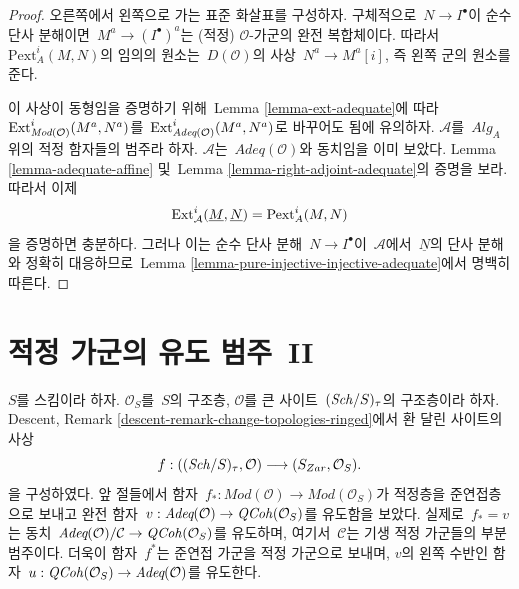 \begin{proof}
오른쪽에서 왼쪽으로 가는 표준 화살표를 구성하자. 구체적으로\ 
$N \to I^\bullet$이 순수 단사 분해이면\ 
$M^a \to (I^\bullet)^a$는 (적정) $\mathcal{O}$-가군의 완전
복합체이다. 따라서\  $\text{Pext}^i_A(M, N)$의 임의의 원소는\ 
$D(\mathcal{O})$의 사상\  $N^a \to M^a[i]$, 즉 왼쪽 군의 원소를 준다.

\medskip\noindent
이 사상이 동형임을 증명하기 위해\  Lemma
\ref{lemma-ext-adequate}에 따라\ 
$\mathop{\mathrm{Ext}}\nolimits^i_{\textit{Mod}(\mathcal{O})}(M^a, N^a)$를\ 
$\mathop{\mathrm{Ext}}\nolimits^i_{\textit{Adeq}(\mathcal{O})}(M^a, N^a)$로 바꾸어도 됨에
유의하자. $\mathcal{A}$를\  $\textit{Alg}_A$ 위의 적정 함자들의
범주라 하자. $\mathcal{A}$는\  $\textit{Adeq}(\mathcal{O})$와
동치임을 이미 보았다. Lemma \ref{lemma-adequate-affine} 및\  Lemma
\ref{lemma-right-adjoint-adequate}의 증명을 보라. 따라서 이제
$$
\mathop{\mathrm{Ext}}\nolimits^i_\mathcal{A}(\underline{M}, \underline{N}) =
\text{Pext}^i_A(M, N)
$$
을 증명하면 충분하다. 그러나 이는 순수 단사 분해\ 
$N \to I^\bullet$이\  $\mathcal{A}$에서\  $\underline{N}$의 단사 분해와
정확히 대응하므로\  Lemma
\ref{lemma-pure-injective-injective-adequate}에서 명백히 따른다.
\end{proof}






\section{적정 가군의 유도 범주\  II}
\label{section-derived-categories}

\noindent
$S$를 스킴이라 하자. $\mathcal{O}_S$를\  $S$의 구조층,
$\mathcal{O}$를 큰 사이트\  $(\mathit{Sch}/S)_\tau$의 구조층이라 하자.
Descent, Remark \ref{descent-remark-change-topologies-ringed}에서 환 달린
사이트의 사상
\begin{equation}
\label{equation-compare-big-small}
f :
((\mathit{Sch}/S)_\tau, \mathcal{O})
\longrightarrow
(S_{Zar}, \mathcal{O}_S).
\end{equation}
을 구성하였다. 앞 절들에서 함자\ 
$f_* : \textit{Mod}(\mathcal{O}) \to \textit{Mod}(\mathcal{O}_S)$가
적정층을 준연접층으로 보내고 완전 함자\ 
$v : \textit{Adeq}(\mathcal{O}) \to \mathit{QCoh}(\mathcal{O}_S)$를 유도함을
보았다. 실제로\  $f_* = v$는 동치\ 
$\textit{Adeq}(\mathcal{O})/\mathcal{C} \to \mathit{QCoh}(\mathcal{O}_S)$를
유도하며, 여기서\  $\mathcal{C}$는 기생 적정 가군들의 부분범주이다.
더욱이 함자\  $f^*$는 준연접 가군을 적정 가군으로 보내며,
$v$의 왼쪽 수반인 함자\ 
$u : \mathit{QCoh}(\mathcal{O}_S) \to \textit{Adeq}(\mathcal{O})$를 유도한다.

